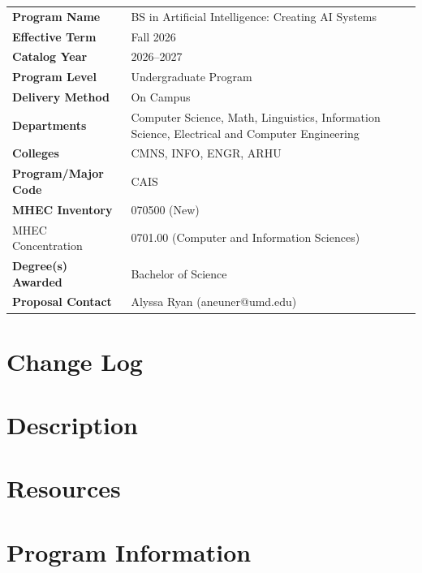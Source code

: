 \documentclass[
10pt, %
a4paper, %
oneside, %
headinclude,footinclude, %
BCOR5mm, %
]{scrartcl}
\begin{document}
\begin{tabular}{lp{8cm}}
\toprule
\textbf{Program Name} & BS in Artificial Intelligence: Creating AI Systems \\
\textbf{Effective Term} & Fall 2026 \\
\textbf{Catalog Year} & 2026--2027 \\
\textbf{Program Level} & Undergraduate Program \\
\textbf{Delivery Method} & On Campus \\
\textbf{Departments} & Computer Science, Math, Linguistics, Information Science, Electrical and Computer Engineering \\
\textbf{Colleges} & CMNS, INFO, ENGR, ARHU \\
\textbf{Program/Major Code} & CAIS \\
\textbf{MHEC Inventory} & 070500 (New) \\
{MHEC Concentration} & 0701.00 (Computer and Information Sciences) \\  %
\textbf{Degree(s) Awarded} & Bachelor of Science \\
\textbf{Proposal Contact} & Alyssa Ryan (aneuner@umd.edu)  \\
\bottomrule
\end{tabular}

\section{Change Log}



\section{Description}



\section{Resources}



\section{Program Information}


\end{document}
